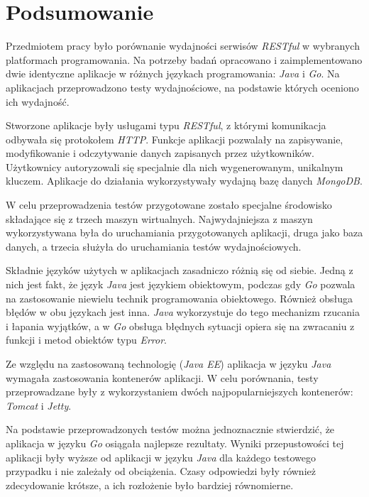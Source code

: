 \chapter{Podsumowanie}

Przedmiotem pracy było porównanie wydajności serwisów \textsl{RESTful} w wybranych platformach programowania. Na potrzeby badań opracowano i zaimplementowano dwie identyczne aplikacje w różnych językach programowania: \textsl{Java} i \textsl{Go}. Na aplikacjach przeprowadzono testy wydajnościowe, na podstawie których oceniono ich wydajność.

Stworzone aplikacje były usługami typu \textsl{RESTful}, z którymi komunikacja odbywała się protokołem \textsl{HTTP}. Funkcje aplikacji pozwalały na zapisywanie, modyfikowanie i odczytywanie danych  zapisanych przez użytkowników. Użytkownicy autoryzowali się specjalnie dla nich wygenerowanym, unikalnym kluczem. Aplikacje do działania wykorzystywały wydajną bazę danych \textsl{MongoDB}.

W celu przeprowadzenia testów przygotowane zostało specjalne środowisko składające się z trzech maszyn wirtualnych. Najwydajniejsza z maszyn wykorzystywana była do uruchamiania przygotowanych aplikacji, druga jako baza danych, a  trzecia  służyła do uruchamiania testów wydajnościowych.

Składnie języków użytych w aplikacjach zasadniczo różnią się od siebie. Jedną z nich jest fakt, że język \textsl{Java} jest językiem obiektowym, podczas gdy \textsl{Go} pozwala na zastosowanie niewielu technik programowania obiektowego. Również obsługa błędów w obu językach jest inna. \textsl{Java} wykorzystuje do tego mechanizm rzucania i łapania wyjątków, a w \textsl{Go} obsługa błędnych sytuacji opiera się na zwracaniu z funkcji i metod obiektów typu \textsl{Error}.

Ze względu na zastosowaną technologię (\textsl{Java EE}) aplikacja w języku \textsl{Java} wymagała zastosowania kontenerów aplikacji. W celu porównania, testy przeprowadzane były z wykorzystaniem dwóch najpopularniejszych kontenerów: \textsl{Tomcat} i \textsl{Jetty}. 
 
Na podstawie  przeprowadzonych testów można jednoznacznie stwierdzić, że aplikacja w języku \textsl{Go} osiągała najlepsze rezultaty. Wyniki przepustowości tej aplikacji były wyższe od aplikacji w języku \textsl{Java} dla każdego  testowego przypadku i nie zależały od obciążenia.  Czasy odpowiedzi były również zdecydowanie krótsze, a ich rozłożenie było bardziej równomierne.    

